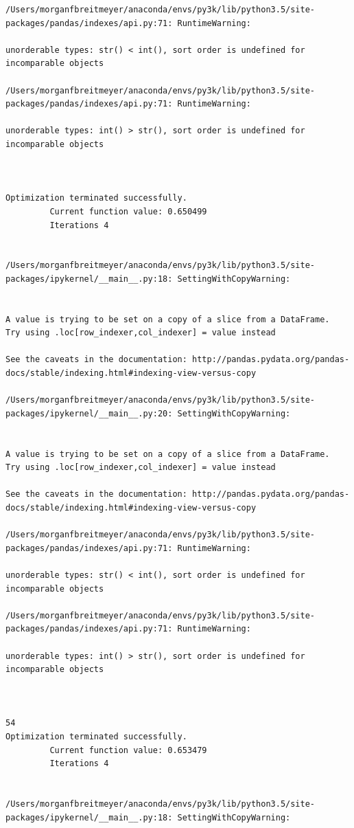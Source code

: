 \begin{lstlisting}
/Users/morganfbreitmeyer/anaconda/envs/py3k/lib/python3.5/site-packages/pandas/indexes/api.py:71: RuntimeWarning:

unorderable types: str() < int(), sort order is undefined for incomparable objects

/Users/morganfbreitmeyer/anaconda/envs/py3k/lib/python3.5/site-packages/pandas/indexes/api.py:71: RuntimeWarning:

unorderable types: int() > str(), sort order is undefined for incomparable objects



Optimization terminated successfully.
         Current function value: 0.650499
         Iterations 4


/Users/morganfbreitmeyer/anaconda/envs/py3k/lib/python3.5/site-packages/ipykernel/__main__.py:18: SettingWithCopyWarning:


A value is trying to be set on a copy of a slice from a DataFrame.
Try using .loc[row_indexer,col_indexer] = value instead

See the caveats in the documentation: http://pandas.pydata.org/pandas-docs/stable/indexing.html#indexing-view-versus-copy

/Users/morganfbreitmeyer/anaconda/envs/py3k/lib/python3.5/site-packages/ipykernel/__main__.py:20: SettingWithCopyWarning:


A value is trying to be set on a copy of a slice from a DataFrame.
Try using .loc[row_indexer,col_indexer] = value instead

See the caveats in the documentation: http://pandas.pydata.org/pandas-docs/stable/indexing.html#indexing-view-versus-copy

/Users/morganfbreitmeyer/anaconda/envs/py3k/lib/python3.5/site-packages/pandas/indexes/api.py:71: RuntimeWarning:

unorderable types: str() < int(), sort order is undefined for incomparable objects

/Users/morganfbreitmeyer/anaconda/envs/py3k/lib/python3.5/site-packages/pandas/indexes/api.py:71: RuntimeWarning:

unorderable types: int() > str(), sort order is undefined for incomparable objects



54
Optimization terminated successfully.
         Current function value: 0.653479
         Iterations 4


/Users/morganfbreitmeyer/anaconda/envs/py3k/lib/python3.5/site-packages/ipykernel/__main__.py:18: SettingWithCopyWarning:



\end{lstlisting}
